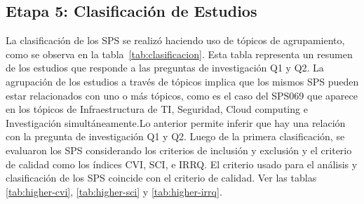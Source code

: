 \subsection{Etapa 5: Clasificación de Estudios}\label{sec:clasificacion-estudios}
La clasificación de los SPS se realizó haciendo uso de tópicos de agrupamiento, como se observa en la tabla~\ref{tab:clasificacion}. Esta tabla representa un resumen de los estudios que responde a las preguntas de investigación Q1 y Q2. La agrupación de los estudios a través de tópicos implica que los mismos SPS pueden estar relacionados con uno o más tópicos, como es el caso del SPS069 que aparece en los tópicos de Infraestructura de TI, Seguridad, Cloud computing e Investigación simultáneamente.Lo anterior permite inferir que hay una relación con la pregunta de investigación Q1 y Q2. 
Luego de la primera clasificación, se evaluaron los SPS considerando los criterios de inclusión y exclusión y el criterio de calidad como los índices CVI, SCI, e IRRQ. El criterio usado para el análisis y clasificación de los SPS coincide con el criterio de calidad. Ver las tablas \ref{tab:higher-cvi}, \ref{tab:higher-sci} y \ref{tab:higher-irrq}.


\onecolumn

